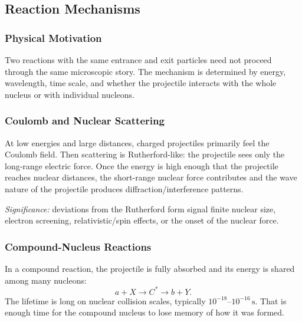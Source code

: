 \subsection{Reaction Mechanisms}
\label{subsec:lec10:mechanisms}

\subsubsection*{Physical Motivation}
Two reactions with the same entrance and exit particles need not proceed through
the same microscopic story. The mechanism is determined by energy, wavelength,
time scale, and whether the projectile interacts with the whole nucleus or with
individual nucleons.

\subsubsection*{Coulomb and Nuclear Scattering}
At low energies and large distances, charged projectiles primarily feel the
Coulomb field. Then scattering is Rutherford-like: the projectile sees only the
long-range electric force. Once the energy is high enough that the projectile
reaches nuclear distances, the short-range nuclear force contributes and the
wave nature of the projectile produces diffraction/interference patterns.

\textit{Significance:} deviations from the Rutherford form signal finite nuclear
size, electron screening, relativistic/spin effects, or the onset of the nuclear
force.

\subsubsection*{Compound-Nucleus Reactions}
In a compound reaction, the projectile is fully absorbed and its energy is shared
among many nucleons:
\begin{equation}
  \label{eq:lec10:compound_sequence}
  a+X \longrightarrow C^\ast \longrightarrow b+Y.
\end{equation}
The lifetime is long on nuclear collision scales, typically
$10^{-18}$--$10^{-16}\,\text{s}$. That is enough time for the compound nucleus to
lose memory of how it was formed.

